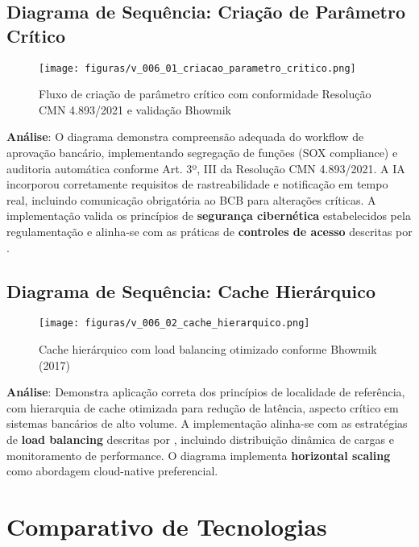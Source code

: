 \subsection{Diagrama de Sequência: Criação de Parâmetro Crítico}

\begin{figure}[h]
    \centering
    \texttt{[image: figuras/v\_006\_01\_criacao\_parametro\_critico.png]} 
    \caption{Fluxo de criação de parâmetro crítico com conformidade Resolução CMN 4.893/2021 e validação Bhowmik}
    \label{fig:v_006_01_criacao_parametro_critico}
\end{figure}

\textbf{Análise}: O diagrama demonstra compreensão adequada do workflow de aprovação bancário, implementando segregação de funções (SOX compliance) e auditoria automática conforme Art. 3º, III da Resolução CMN 4.893/2021. A IA incorporou corretamente requisitos de rastreabilidade e notificação em tempo real, incluindo comunicação obrigatória ao BCB para alterações críticas. A implementação valida os princípios de \textbf{segurança cibernética} estabelecidos pela regulamentação e alinha-se com as práticas de \textbf{controles de acesso} descritas por .

\subsection{Diagrama de Sequência: Cache Hierárquico}

\begin{figure}[h]
    \centering
    \texttt{[image: figuras/v\_006\_02\_cache\_hierarquico.png]} 
    \caption{Cache hierárquico com load balancing otimizado conforme Bhowmik (2017)}
    \label{fig:v_006_02_cache_hierarquico}
\end{figure}

\textbf{Análise}: Demonstra aplicação correta dos princípios de localidade de referência, com hierarquia de cache otimizada para redução de latência, aspecto crítico em sistemas bancários de alto volume. A implementação alinha-se com as estratégias de \textbf{load balancing} descritas por , incluindo distribuição dinâmica de cargas e monitoramento de performance. O diagrama implementa \textbf{horizontal scaling} como abordagem cloud-native preferencial.

\section{Comparativo de Tecnologias}

